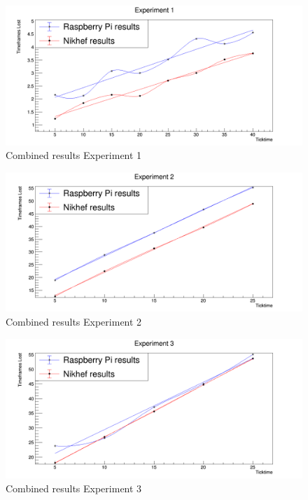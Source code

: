 \documentclass{report}
\begin{document}
\begin{figure}[!htbp]
	\centering
	\includegraphics[width=\textwidth,height=\textheight,keepaspectratio]{./graphics/ex1_combined.png}
	\caption{Combined results Experiment 1}
	\label{fig:Ex1Combined}
\end{figure}
\begin{figure}[!htbp]
	\centering
	\includegraphics[width=\textwidth,height=\textheight,keepaspectratio]{./graphics/ex2_combined.png}
	\caption{Combined results Experiment 2}
	\label{fig:Ex2Combined}
\end{figure}
\begin{figure}[!htbp]
	\centering
	\includegraphics[width=\textwidth,height=\textheight,keepaspectratio]{./graphics/ex3_combined.png}
	\caption{Combined results Experiment 3}
	\label{fig:Ex3Combined}
\end{figure}
\end{document}
